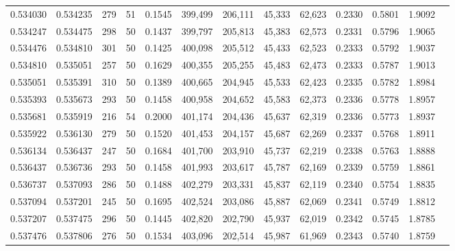 \begin{tabular}{rrrrrrrrrrrrr}
0.534030 & 0.534235 &   279 &  51 &                                     0.1545 & 399,499 & 206,111 &  45,333 &  62,623 & 0.2330 & 0.5801 & 1.9092 \\
0.534247 & 0.534475 &   298 &  50 &                                     0.1437 & 399,797 & 205,813 &  45,383 &  62,573 & 0.2331 & 0.5796 & 1.9065 \\
0.534476 & 0.534810 &   301 &  50 &                                     0.1425 & 400,098 & 205,512 &  45,433 &  62,523 & 0.2333 & 0.5792 & 1.9037 \\
0.534810 & 0.535051 &   257 &  50 &                                     0.1629 & 400,355 & 205,255 &  45,483 &  62,473 & 0.2333 & 0.5787 & 1.9013 \\
0.535051 & 0.535391 &   310 &  50 &                                     0.1389 & 400,665 & 204,945 &  45,533 &  62,423 & 0.2335 & 0.5782 & 1.8984 \\
0.535393 & 0.535673 &   293 &  50 &                                     0.1458 & 400,958 & 204,652 &  45,583 &  62,373 & 0.2336 & 0.5778 & 1.8957 \\
0.535681 & 0.535919 &   216 &  54 &                                     0.2000 & 401,174 & 204,436 &  45,637 &  62,319 & 0.2336 & 0.5773 & 1.8937 \\
0.535922 & 0.536130 &   279 &  50 &                                     0.1520 & 401,453 & 204,157 &  45,687 &  62,269 & 0.2337 & 0.5768 & 1.8911 \\
0.536134 & 0.536437 &   247 &  50 &                                     0.1684 & 401,700 & 203,910 &  45,737 &  62,219 & 0.2338 & 0.5763 & 1.8888 \\
0.536437 & 0.536736 &   293 &  50 &                                     0.1458 & 401,993 & 203,617 &  45,787 &  62,169 & 0.2339 & 0.5759 & 1.8861 \\
0.536737 & 0.537093 &   286 &  50 &                                     0.1488 & 402,279 & 203,331 &  45,837 &  62,119 & 0.2340 & 0.5754 & 1.8835 \\
0.537094 & 0.537201 &   245 &  50 &                                     0.1695 & 402,524 & 203,086 &  45,887 &  62,069 & 0.2341 & 0.5749 & 1.8812 \\
0.537207 & 0.537475 &   296 &  50 &                                     0.1445 & 402,820 & 202,790 &  45,937 &  62,019 & 0.2342 & 0.5745 & 1.8785 \\
0.537476 & 0.537806 &   276 &  50 &                                     0.1534 & 403,096 & 202,514 &  45,987 &  61,969 & 0.2343 & 0.5740 & 1.8759 \\

\end{tabular}
